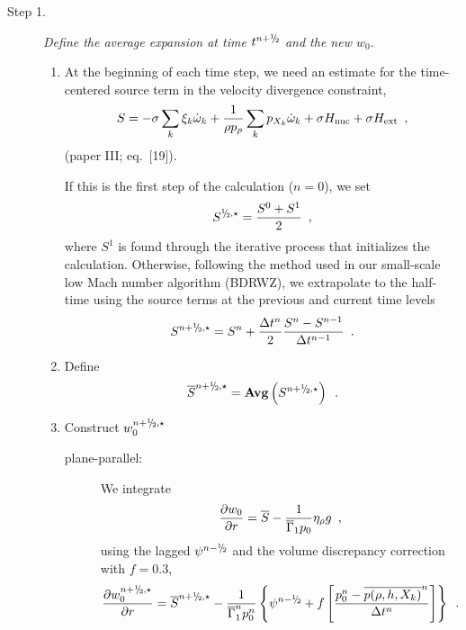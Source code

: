 \begin{description}

\item[Step 1.] {\em Define the average expansion at time $t^\nph$ and the new $w_0.$}

\begin{enumerate}
\renewcommand{\theenumi}{{\bf \alph{enumi}}}

\item At the beginning of each time step, we need an estimate for the time-centered
source term in the velocity divergence constraint,
\begin{equation}
  S =  -\sigma  \sum_k  \xi_k \dot{\omega}_k  + 
  \frac{1}{\rho p_\rho} \sum_k p_{X_k}  {\dot{\omega}}_k  + \sigma {H_{\rm nuc}} + \sigma {H_{\rm ext}} \enskip ,
\label{eq:defineS} 
\end{equation}
(paper III; eq.~[19]).

If this is the first step of the calculation ($n=0$), we set
\begin{equation}
S^{\myhalf,\star} = \frac{S^0 + S^1}{2} \enskip ,
\end{equation}
where $S^1$ is found through the iterative process that initializes the calculation.
Otherwise, following the method used in our small-scale low Mach number algorithm
(BDRWZ), we extrapolate to the half-time using the source
terms at the previous and current time levels
\begin{equation}
S^{\nph,\star} = S^n + \frac{\Delta t^n}{2} \frac{S^n - S^{n-1}}{\Delta t^{n-1}} \enskip .
\end{equation}

\item Define
\begin{equation}
\overline{S}^{\nph,\star} = {\mathrm{\bf Avg}} \left(S^{\nph,\star}\right) \enskip .
\end{equation}

\item Construct $w_0^{\nph,\star}$

\begin{description}

\item[plane-parallel:] We integrate
\begin{equation}
\frac{\partial w_0}{\partial r} =  \overline{S} - \frac{1}{\overline{\Gamma}_1 p_0} \eta_{\rho} g 
\enskip \label{eq:divw0} ,
\end{equation}
using the lagged $\psi^{\nmh}$ and the volume discrepancy correction with $f=0.3$,
\begin{equation}
\frac{\partial w_0^{\nph,\star}}{\partial r} =  \overline{S}^{\nph,\star} 
- \frac{1}{\gammabar^{n} p_0^{n}}
\left\{ \psi^{\nmh} + 
f \left[\frac{p_0^n - \overline{p(\rho,h,X_k)}^n}{\Delta t^n} \right]\right\}
\enskip .
\end{equation}


\end{description}
\end{enumerate}
\end{description}
